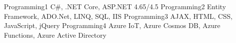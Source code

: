 %
%
%

    \begin{keywords}
        \keywordsentry
            {Programming1}
            {
                C\#,
                .NET Core,
                ASP.NET 4.65/4.5
            }
        \keywordsentry
            {Programming2}
            {
                Entity Framework,
                ADO.Net,
                LINQ,
                SQL,
                IIS
            }
        \keywordsentry
            {Programming3}
            {
                AJAX,
                HTML, 
                CSS, 
                JavaScript,
                jQuery
            }
        \keywordsentry
            {Programming4}
            {
                Azure IoT, 
                Azure Cosmos DB, 
                Azure Functions,
                Azure Active Directory
            }
    \end{keywords}
